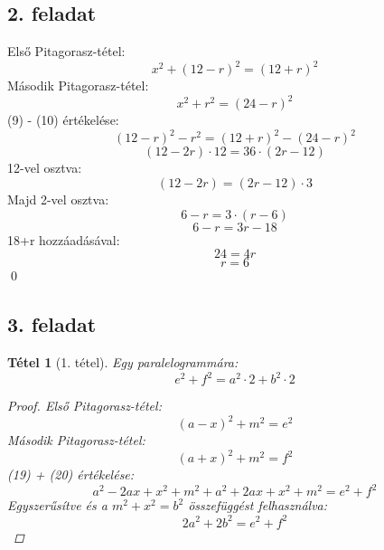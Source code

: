 \documentclass{article}
\newtheorem{theorem}{Tétel}
\begin{document}
\subsection{2. feladat}

Első Pitagorasz-tétel:
\begin{equation}
    x^2 + (12-r)^2 = (12+r)^2
\end{equation}
Második Pitagorasz-tétel:
\begin{equation}
    x^2 + r^2 = (24-r)^2
\end{equation}
(9) - (10) értékelése:
\begin{equation}
    (12-r)^2 - r^2 = (12+r)^2 - (24-r)^2
\end{equation}
\begin{equation}
    (12-2r) \cdot 12 = 36 \cdot (2r - 12)
\end{equation}
12-vel osztva:
\begin{equation}
    (12-2r) = (2r - 12) \cdot 3
\end{equation}
Majd 2-vel osztva:
\begin{equation}
    6-r = 3 \cdot (r-6)
\end{equation}
\begin{equation}
    6-r = 3r - 18
\end{equation}
18+r hozzáadásával:
\begin{equation}
    24 = 4r
\end{equation}
\begin{equation}
    r = 6
\end{equation}
\qed

\subsection{3. feladat}
\begin{theorem}[1. tétel]
Egy paralelogrammára:
\begin{equation}
    e^2 + f^2 = a^2 \cdot2 + b^2 \cdot2
\end{equation}
\begin{proof}
Első Pitagorasz-tétel:
\begin{equation}
    (a-x)^2 + m^2 = e^2
\end{equation}
Második Pitagorasz-tétel:
\begin{equation}
    (a+x)^2 + m^2 = f^2
\end{equation}
(19) + (20) értékelése:
\begin{equation}
    a^2 - 2ax + x^2 + m^2 + a^2 + 2ax + x^2 + m^2 = e^2 + f^2
\end{equation}
Egyszerűsítve és a $m^2 + x^2 = b^2$ összefüggést felhasználva:
\begin{equation}
    2a^2 + 2b^2 = e^2 + f^2
\end{equation}
\end{proof}

\end{theorem}
\end{document}
